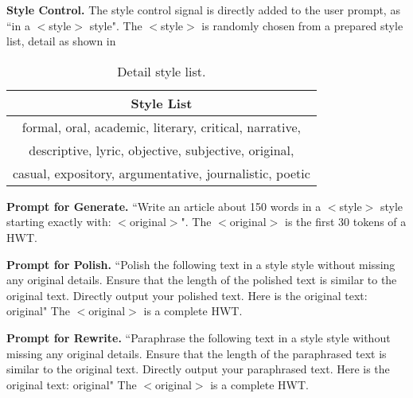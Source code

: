 \documentclass[sigconf, screen, review, anonymous]{acmart}
\begin{document}
\noindent \textbf{Style Control. }
The style control signal is directly added to the user prompt, as ``in a $<$style$>$ style".
%
The $<$style$>$ is randomly chosen from a prepared style list, detail as shown in ~
\begin{table}[htbp]
    \centering
    \caption{Detail style list.}
    \begin{tabular}{c}
    \hline

    \hline

    \hline
    Style List \\
    \hline
    formal, oral, academic, literary, critical, narrative, \\
    descriptive, lyric, objective, subjective, original,\\
    casual, expository, argumentative, journalistic, poetic\\
    \hline

    \hline

    \hline
    \end{tabular}
    \label{tab:style_list}
\end{table}

\noindent \textbf{Prompt for Generate. }
``Write an article about 150 words in a $<$style$>$ style starting exactly with: $<$original$>$".
%
The $<$original$>$ is the first 30 tokens of a HWT.

\noindent \textbf{Prompt for Polish. }
``Polish the following text in a {style} style without missing any original details. Ensure that the length of the polished text is similar to the original text. Directly output your polished text. Here is the original text: {original}"
%
The $<$original$>$ is a complete HWT.

\noindent \textbf{Prompt for Rewrite. }
``Paraphrase the following text in a {style} style without missing any original details. Ensure that the length of the paraphrased text is similar to the original text. Directly output your paraphrased text. Here is the original text: {original}"
%
The $<$original$>$ is a complete HWT.
\end{document}
